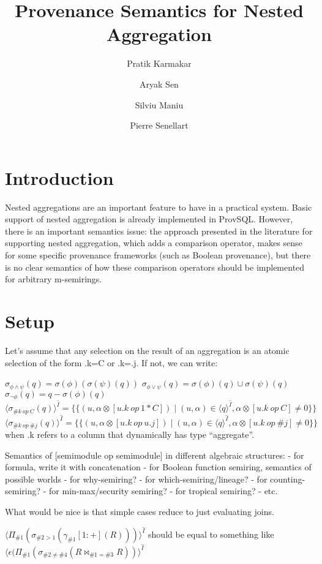 \documentclass[twocolumn]{article}
\title{Provenance Semantics for Nested Aggregation}
\author{Pratik Karmakar \and Aryak Sen \and Silviu Maniu \and Pierre Senellart}
\date{}
\begin{document}
\maketitle
\section{Introduction}
Nested aggregations are an important feature to
have in a practical system. Basic support of nested aggregation
is already implemented in ProvSQL. However, there is an
important semantics issue: the approach presented in the
literature for supporting nested aggregation, which adds a
comparison operator, makes sense for some specific provenance
frameworks (such as Boolean provenance), but there is no
clear semantics of how these comparison operators should
be implemented for arbitrary m-semirings.

\section{Setup}
Let's assume that any selection on the result of an aggregation is an 
atomic selection of the form .k=C or .k=.j. If not, we can write:

$\sigma_{\phi\land\psi}(q)=\sigma(\phi)(\sigma(\psi)(q))$
$\sigma_{\phi\lor\psi}(q)=\sigma(\phi)(q)\cup\sigma(\psi)(q)$
$\sigma_{\lnot\phi}(q)=q-\sigma(\phi)(q)$\\

$
\langle\sigma_{\#k\ op\ C}(q)\rangle^{\hat I}
=\{\{(u,\alpha\otimes[u.k\ op\ 1*C])\mid(u,\alpha)\in \langle q\rangle^{\hat I}, \alpha\otimes[u.k\ op\ C]\neq 0\}\}
$\\

$
\langle\sigma_{\#k\ op\ \#j}(q)\rangle^{\hat I}
=\{\{(u,\alpha\otimes[u.k\ op\ u.j])\mid(u,\alpha)\in \langle q\rangle^{\hat I}, \alpha\otimes[u.k\ op\ \#j]\neq 0\}\}
$\\
when .k refers to a column that dynamically has type “aggregate”.

Semantics of [semimodule op semimodule] in different algebraic structures:
- for formula, write it with concatenation
- for Boolean function semiring, semantics of possible worlds
- for why-semiring?
- for which-semiring/lineage?
- for counting-semiring?
- for min-max/security semiring?
- for tropical semiring?
- etc.

What would be nice is that simple cases reduce to just evaluating joins.

$\langle\Pi_{\#1}(\sigma_{\#2>1}(\gamma_{\#1}[1:+](R)))\rangle^{\hat I}$
should be equal to something like
$\langle \epsilon(\Pi_{\#1}(\sigma_{\#2\neq\#4}(R\bowtie_{\#1=\#3} R))\rangle^{\hat I}$
\end{document}
